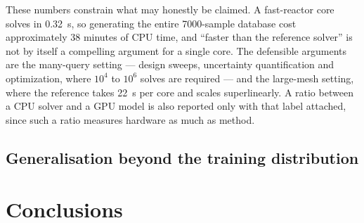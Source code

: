 \documentclass[preprint,12pt]{elsarticle}
\begin{document}
These numbers constrain what may honestly be claimed. A fast-reactor core
solves in 0.32~s, so generating the entire 7000-sample database cost
approximately 38 minutes of CPU time, and ``faster than the reference solver''
is not by itself a compelling argument for a single core. The defensible
arguments are the many-query setting --- design sweeps, uncertainty
quantification and optimization, where $10^4$ to $10^6$ solves are required ---
and the large-mesh setting, where the reference takes 22~s per core and scales
superlinearly. A ratio between a CPU solver and a GPU model is also reported
only with that label attached, since such a ratio measures hardware as much as
method.


\subsection{Generalisation beyond the training distribution}
\label{sec:res-generalisation}

\section{Conclusions}
\label{sec:conclusions}

\end{document}
